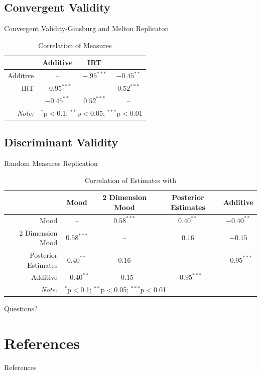 \documentclass{beamer}              %
\begin{document}
\subsection{Convergent Validity}
\begin{frame}{Convergent Validity-Ginsburg and Melton Replicaton}
	\begin{table}[ht]
		\centering\caption*{Correlation of Measures}\label{Correlation}
		\begin{tabular}{rccc}
			\hline
			& Additive & IRT & \citeauthor{Melton2014} \\ 
			\hline
			Additive & -- & $-.95^{***}$ &$-0.45^{**}$ \\ 
			IRT & $-0.95^{***}$ & -- & $0.52^{***}$ \\ 
			\citeauthor{Melton2014} & $-0.45^{**}$  &  $0.52^{***}$ & --\\ 
			\hline
			\textit{Note:}  & \multicolumn{3}{l}{$^{*}$p$<$0.1; $^{**}$p$<$0.05; $^{***}$p$<$0.01} \\
		\end{tabular}
	\end{table}
\end{frame}
\subsection{Discriminant Validity}
\begin{frame}{Random Measures Replication}
	\begin{table}[ht]
		\centering\caption{Correlation of Estimates with \citet{Enns2013}}\label{EKCor}
		\begin{tabular}{rcccc}
			\hline
			&  Mood &  2 Dimension Mood & Posterior Estimates & Additive \\ 
			\hline
			Mood & -- & $0.58^{***}$ & $0.40^{**}$ & $-0.40^{**}$ \\ 
			2 Dimension Mood &  $0.58^{***}$ & -- & $0.16$ & $-0.15$ \\ 
			Posterior Estimates &  $0.40^{**}$  &  $0.16$  & -- & $-0.95^{***}$ \\ 
			Additive & $-0.40^{**}$  & $-0.15$  & $-0.95^{***}$ & -- \\ 
			\hline
			\textit{Note:}  & \multicolumn{4}{l}{$^{*}$p$<$0.1; $^{**}$p$<$0.05; $^{***}$p$<$0.01} \\
		\end{tabular}
	\end{table}
\end{frame}
\begin{frame}{Questions?}
	
\end{frame}
\newpage
\appendix
\section*{References}
\begin{frame}{References}


\end{frame}
\end{document}
